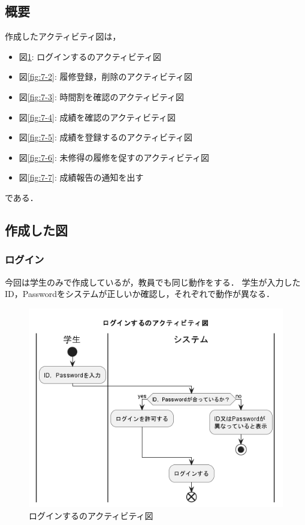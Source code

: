 \documentclass[documentclass]{jsarticle}
\begin{document}
\subsection*{概要}
作成したアクティビティ図は，
\begin{itemize}
  \item 図\ref*{fig:7-1}: ログインするのアクティビティ図
  \item 図\ref*{fig:7-2}: 履修登録，削除のアクティビティ図
  \item 図\ref*{fig:7-3}: 時間割を確認のアクティビティ図
  \item 図\ref*{fig:7-4}: 成績を確認のアクティビティ図
  \item 図\ref*{fig:7-5}: 成績を登録するのアクティビティ図
  \item 図\ref*{fig:7-6}: 未修得の履修を促すのアクティビティ図
  \item 図\ref*{fig:7-7}: 成績報告の通知を出す
\end{itemize}
である．

\subsection*{作成した図}
\subsubsection*{ログイン}
今回は学生のみで作成しているが，教員でも同じ動作をする．
学生が入力したID，Passwordをシステムが正しいか確認し，それぞれで動作が異なる．

\begin{figure}[H]
  \begin{center}
    \includegraphics*[scale=0.4]{figure/7-1.png}
  \end{center}
  \caption{ログインするのアクティビティ図}
  \label{fig:7-1}
\end{figure}
\end{document}
